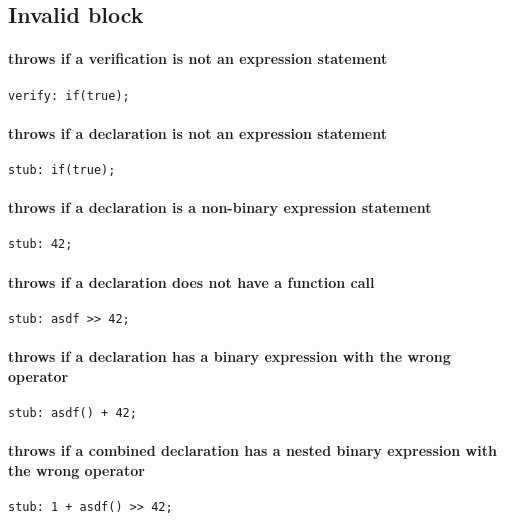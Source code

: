 \subsection*{Invalid block}

\paragraph*{throws if a verification is not an expression statement}
\begin{verbatim}
verify: if(true);
\end{verbatim}
\paragraph*{throws if a declaration is not an expression statement}
\begin{verbatim}
stub: if(true);
\end{verbatim}
\paragraph*{throws if a declaration is a non-binary expression statement}
\begin{verbatim}
stub: 42;
\end{verbatim}
\paragraph*{throws if a declaration does not have a function call}
\begin{verbatim}
stub: asdf >> 42;
\end{verbatim}
\paragraph*{throws if a declaration has a binary expression with the wrong operator}
\begin{verbatim}
stub: asdf() + 42;
\end{verbatim}
\paragraph*{throws if a combined declaration has a nested binary expression with the wrong operator}
\begin{verbatim}
stub: 1 + asdf() >> 42;
\end{verbatim}

